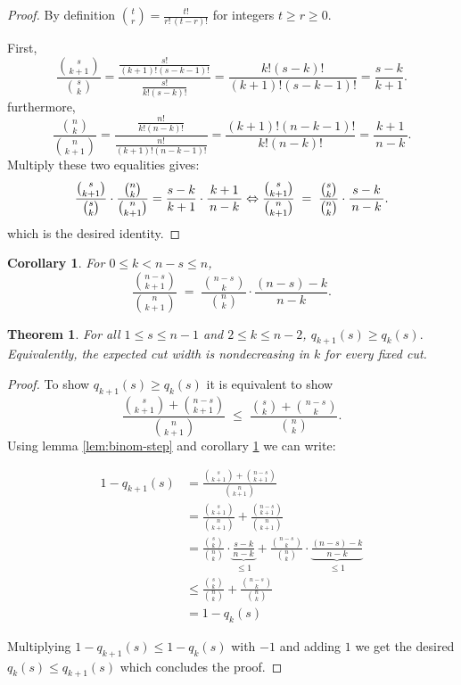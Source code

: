 \documentclass[10pt,twocolumn]{article}
\newtheorem{theorem}{Theorem}[section]
\newtheorem{corollary}{Corollary}[theorem]
\begin{document}
\begin{proof}
By definition $\displaystyle \binom{t}{r}=\frac{t!}{r!\,(t-r)!}$ for integers $t\ge r\ge 0$.

First,
\[
\frac{\binom{s}{k+1}}{\binom{s}{k}}
=\frac{\frac{s!}{(k+1)!(s-k-1)!}}{\frac{s!}{k!(s-k)!}}
=\frac{k!(s-k)!}{(k+1)!(s-k-1)!}
=\frac{s-k}{k+1}.
\]
furthermore,
\[
\frac{\binom{n}{k}}{\binom{n}{k+1}}
=\frac{\frac{n!}{k!(n-k)!}}{\frac{n!}{(k+1)!(n-k-1)!}}
=\frac{(k+1)!(n-k-1)!}{k!(n-k)!}
=\frac{k+1}{\,n-k\,}.
\]
Multiply these two equalities gives:
\[
\frac{\binom{s}{k+1}}{\binom{s}{k}}\cdot\frac{\binom{n}{k}}{\binom{n}{k+1}} =\frac{s-k}{k+1}\cdot \frac{k+1}{\,n-k\,} \\
\Leftrightarrow
\frac{\binom{s}{k+1}}{\binom{n}{k+1}}
\;=\;
\frac{\binom{s}{k}}{\binom{n}{k}}\cdot \frac{s-k}{\,n-k\,}.
\]
which is the desired identity.
\end{proof}

\begin{corollary}\label{cor:binom-step-mirror}
For $0\le k < n-s \le n$,
\[
\frac{\binom{n-s}{k+1}}{\binom{n}{k+1}}
\;=\;
\frac{\binom{n-s}{k}}{\binom{n}{k}}\cdot \frac{(n-s)-k}{\,n-k\,}.
\]
\end{corollary}


\begin{theorem}
\label{thm:qk-monotone}
For all $1\le s\le n-1$ and $2\le k\le n-2$,
\(
q_{k+1}(s)\ge q_k(s).
\)
Equivalently, the expected cut width is nondecreasing in $k$ for \emph{every} fixed cut.
\end{theorem}

\begin{proof}
To show $q_{k+1}(s)\ge q_k(s)$ it is equivalent to show
\[
\frac{\binom{s}{k+1}+\binom{n-s}{k+1}}{\binom{n}{k+1}}
\;\le\;
\frac{\binom{s}{k}+\binom{n-s}{k}}{\binom{n}{k}}.
\]
Using lemma \ref{lem:binom-step} and corollary \ref{cor:binom-step-mirror} we can write:

\begin{equation}
  \begin{aligned}
1-q_{k+1}(s) &= \frac{\binom{s}{k+1}+\binom{n-s}{k+1}}{\binom{n}{k+1}}\\
&= \frac{\binom{s}{k+1}}{\binom{n}{k+1}} +\frac{\binom{n-s}{k+1}}{\binom{n}{k+1}}\\
&= \frac{\binom{s}{k}}{\binom{n}{k}}\cdot\underbrace{\frac{s-k}{n-k}}_{\leq 1} +\frac{\binom{n-s}{k}}{\binom{n}{k}}\cdot\underbrace{\frac{(n-s)-k}{n-k}}_{\leq 1}\\
&\leq \frac{\binom{s}{k}}{\binom{n}{k}} +\frac{\binom{n-s}{k}}{\binom{n}{k}}\\
& = 1- q_{k}(s)
  \end{aligned}
  \end{equation}

Multiplying $1-q_{k+1}(s) \leq 1-q_{k}(s)$ with $-1$ and adding $1$ we get the desired $q_k(s) \leq q_{k+1}(s)$ which concludes the proof.
\end{proof}
\end{document}
